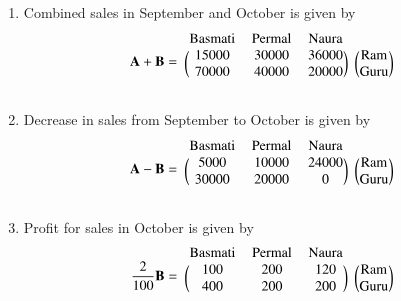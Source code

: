 

%
\begin{enumerate}
    \item Combined sales in September and October is given by
    \begin{align}
    \vec{A}+\vec{B}=
    \begin{blockarray}{cccc}
    \text{Basmati} & \text{Permal} & \text{Naura} \\
    \begin{block}{(ccc)(c)}
    15000 & 30000 & 36000 & \text{Ram}\\
    70000 & 40000 & 20000 & \text{Guru} \\
    \end{block}
    \end{blockarray}
    \end{align}

    \item Decrease in sales from September to October is given by
    \begin{align}
    \vec{A}-\vec{B}=
    \begin{blockarray}{cccc}
    \text{Basmati} & \text{Permal} & \text{Naura} \\
    \begin{block}{(ccc)(c)}
    5000 & 10000 & 24000 & \text{Ram}\\
    30000 & 20000 & 0 & \text{Guru} \\
    \end{block}
    \end{blockarray}
    \end{align}
    
    \item Profit for sales in October is given by
    \begin{align}
    \frac{2}{100}\vec{B} =
    \begin{blockarray}{cccc}
    \text{Basmati} & \text{Permal} & \text{Naura} \\
    \begin{block}{(ccc)(c)}
    100 & 200 & 120 & \text{Ram}\\
    400 & 200 & 200 & \text{Guru} \\
    \end{block}
    \end{blockarray}
    \end{align}
    
\end{enumerate}


